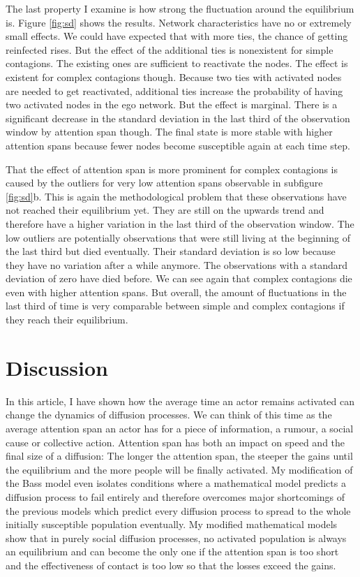 \documentclass[a4paper,12pt]{article}
\begin{document}
The last property I examine is how strong the fluctuation around the equilibrium is. Figure \ref{fig:sd} shows the results. Network characteristics have no or extremely small effects. We could have expected that with more ties, the chance of getting reinfected rises. But the effect of the additional ties is nonexistent for simple contagions. The existing ones are sufficient to reactivate the nodes. The effect is existent for complex contagions though. Because two ties with activated nodes are needed to get reactivated, additional ties increase the probability of having two activated nodes in the ego network. But the effect is marginal. There is a significant decrease in the standard deviation in the last third of the observation window by attention span though. The final state is more stable with higher attention spans because fewer nodes become susceptible again at each time step. 

That the effect of attention span is more prominent for complex contagions is caused by the outliers for very low attention spans observable in subfigure \ref{fig:sd}b. This is again the methodological problem that these observations have not reached their equilibrium yet. They are still on the upwards trend and therefore have a higher variation in the last third of the observation window. The low outliers are potentially observations that were still living at the beginning of the last third but died eventually. Their standard deviation is so low because they have no variation after a while anymore. The observations with a standard deviation of zero have died before. We can see again that complex contagions die even with higher attention spans. But overall, the amount of fluctuations in the last third of time is very comparable between simple and complex contagions if they reach their equilibrium.

\section{Discussion}

In this article, I have shown how the average time an actor remains activated can change the dynamics of diffusion processes. We can think of this time as the average attention span an actor has for a piece of information, a rumour, a social cause or collective action. Attention span has both an impact on speed and the final size of a diffusion: The longer the attention span, the steeper the gains until the equilibrium and the more people will be finally activated. My modification of the Bass model even isolates conditions where a mathematical model predicts a diffusion process to fail entirely and therefore overcomes major shortcomings of the previous models which predict every diffusion process to spread to the whole initially susceptible population eventually. My modified mathematical models show that in purely social diffusion processes, no activated population is always an equilibrium and can become the only one if the attention span is too short and the effectiveness of contact is too low so that the losses exceed the gains.
\end{document}
